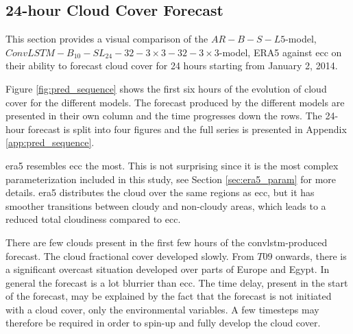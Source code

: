 \subsection{24-hour Cloud Cover Forecast}
This section provides a visual comparison of the $AR-B-S-L5$-model, $ConvLSTM-B_{10}-SL_{24}-32-3\times3-32-3 \times3$-model, ERA5 against \acrshort{ecc} on their ability to forecast cloud cover for 24 hours starting from January 2, 2014.

Figure \ref{fig:pred_sequence} shows the first six hours of the evolution of cloud cover for the different models. The forecast produced by the different models are presented in their own column and the time progresses down the rows. The 24-hour forecast is split into four figures and the full series is presented in Appendix \ref{app:pred_sequence}. 

\acrshort{era5} resembles \acrshort{ecc} the most. This is not surprising since it is the most complex parameterization included in this study, see Section \ref{sec:era5_param} for more details. \acrshort{era5} distributes the cloud over the same regions as \acrshort{ecc}, but it has smoother transitions between cloudy and non-cloudy areas, which leads to a reduced total cloudiness compared to \acrshort{ecc}.

There are few clouds present in the first few hours of the \acrshort{convlstm}-produced forecast. The cloud fractional cover developed slowly. From $T09$ onwards, there is a significant overcast situation developed over parts of Europe and Egypt. In general the forecast is a lot blurrier than \acrshort{ecc}. The time delay, present in the start of the forecast, may be explained by the fact that the forecast is not initiated with a cloud cover, only the environmental variables. A  few timesteps may therefore be required in order to spin-up and fully develop the cloud cover.

